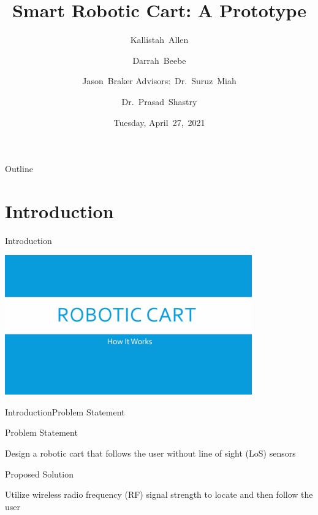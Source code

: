 \documentclass{beamer}
\title[Smart Robotic Cart]{Smart Robotic Cart: A Prototype}
\author[K.~Allen, D.~Beebe, J.~Braker]{Kallistah~Allen \and Darrah~Beebe \and Jason~Braker
Advisors:~Dr.~Suruz~Miah \and Dr.~Prasad~Shastry}
\institute[Bradley University] %
{
  Department of Electrical and Computer Engineering\\
  Bradley University\\
  1501 W. Bradley Avenue\\
  Peoria, IL, 61625, USA
}
\date[April~20,~2021]{Tuesday, April~27,~2021}
\begin{document}
\begin{frame}
  \titlepage
\end{frame}

\begin{frame}{Outline} 
  \tableofcontents%
\end{frame}

\section{Introduction}

\begin{frame}{Introduction}{}
 \begin{center}
    \href{videos/proposalVideo.mp4}{\includegraphics[width=0.8\textwidth]{figs/img/proposalVideoTitle}}
  \end{center}
\end{frame}

\begin{frame}{Introduction}{Problem Statement}
  \begin{block}{Problem Statement}
    \begin{LARGE}
      Design a robotic cart that follows the user without line of sight (LoS) sensors
    \end{LARGE}
  \end{block}
  \pause
  \begin{block}{Proposed Solution}
    \begin{LARGE}
      Utilize wireless radio frequency (RF) signal strength to locate and then follow the user
    \end{LARGE}
  \end{block}
\end{frame}

\end{document}
